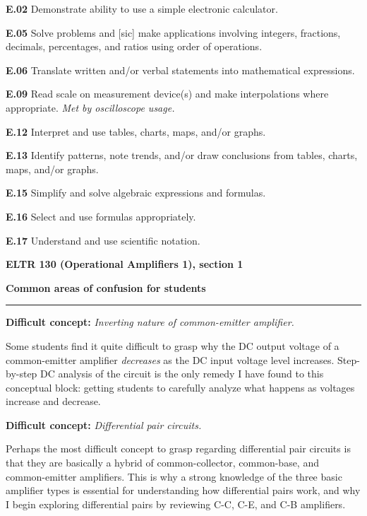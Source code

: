 \item{\bf E.02} Demonstrate ability to use a simple electronic calculator.
\item{\bf E.05} Solve problems and [sic] make applications involving integers, fractions, decimals, percentages, and ratios using order of operations.
\item{\bf E.06} Translate written and/or verbal statements into mathematical expressions.
\item{\bf E.09} Read scale on measurement device(s) and make interpolations where appropriate.  {\it Met by oscilloscope usage.}
\item{\bf E.12} Interpret and use tables, charts, maps, and/or graphs.
\item{\bf E.13} Identify patterns, note trends, and/or draw conclusions from tables, charts, maps, and/or graphs.
\item{\bf E.15} Simplify and solve algebraic expressions and formulas.
\item{\bf E.16} Select and use formulas appropriately.
\item{\bf E.17} Understand and use scientific notation.
\medskip





\vfil \eject

\centerline{\bf ELTR 130 (Operational Amplifiers 1), section 1} \bigskip 
 
\vskip 10pt

\noindent
{\bf Common areas of confusion for students}

\vskip 5pt


\hrule \vskip 5pt

\vskip 10pt

\noindent
{\bf Difficult concept: } {\it Inverting nature of common-emitter amplifier.}

Some students find it quite difficult to grasp why the DC output voltage of a common-emitter amplifier {\it decreases} as the DC input voltage level increases.  Step-by-step DC analysis of the circuit is the only remedy I have found to this conceptual block: getting students to carefully analyze what happens as voltages increase and decrease.

\vskip 10pt

\noindent
{\bf Difficult concept: } {\it Differential pair circuits.}

Perhaps the most difficult concept to grasp regarding differential pair circuits is that they are basically a hybrid of common-collector, common-base, and common-emitter amplifiers.  This is why a strong knowledge of the three basic amplifier types is essential for understanding how differential pairs work, and why I begin exploring differential pairs by reviewing C-C, C-E, and C-B amplifiers.

